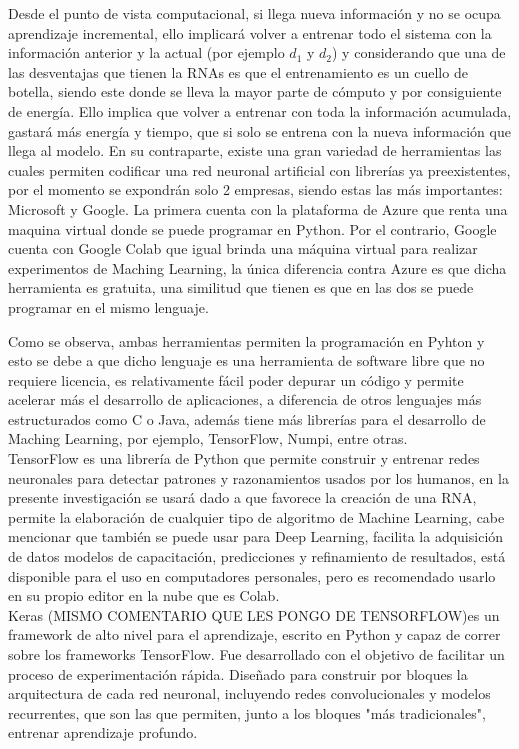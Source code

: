     Desde el punto de vista computacional, si llega nueva información y no se ocupa aprendizaje 
    incremental, ello implicar\'a volver a entrenar todo el sistema con la información anterior y 
    la actual (por ejemplo $d_{1}$ y $d_{2}$) y considerando que una de las desventajas que tienen la 
    RNAs es que el entrenamiento es un cuello de botella, siendo este donde se lleva la mayor 
    parte de cómputo y por consiguiente de energía. Ello implica que volver a entrenar con toda 
    la información acumulada, gastará más energía y tiempo, que si solo se entrena con la nueva 
    información que llega al modelo. En su contraparte,  existe una gran variedad de herramientas 
    las cuales permiten codificar una red neuronal artificial con librerías ya preexistentes, por 
    el momento se expondrán solo 2 empresas, siendo estas las más importantes: Microsoft y Google. 
    La primera cuenta con la plataforma de Azure que renta una maquina virtual donde se puede 
    programar en Python.  Por el contrario, Google cuenta con Google Colab que igual brinda 
    una m\'aquina virtual para realizar experimentos de Maching Learning, la \'unica diferencia 
    contra Azure es que dicha herramienta es gratuita, una similitud que tienen es que en las 
    dos se puede programar en el mismo lenguaje.

    Como se observa, ambas herramientas permiten la programación en Pyhton y esto se debe a que 
    dicho lenguaje es una herramienta de software libre que no requiere licencia, es relativamente 
    fácil poder depurar un código y permite acelerar más el desarrollo de aplicaciones,  a diferencia 
    de otros lenguajes más estructurados como C o Java, adem\'as tiene m\'as librerías para el 
    desarrollo de Maching Learning, por ejemplo, TensorFlow, Numpi, entre otras. \\

    TensorFlow es una librería de Python que permite construir y entrenar redes neuronales para 
    detectar patrones y razonamientos usados por los humanos, en la presente investigaci\'on se 
    usar\'a dado a que favorece la creaci\'on de una RNA, permite la elaboraci\'on de cualquier 
    tipo de algoritmo de Machine Learning, cabe mencionar que también se puede usar para Deep Learning, 
    facilita la adquisici\'on de datos modelos de capacitaci\'on, predicciones y refinamiento de 
    resultados, est\'a disponible para el uso en computadores personales, pero es recomendado 
    usarlo en su propio editor en la nube que es Colab. \\ 

    Keras (MISMO COMENTARIO QUE LES PONGO DE TENSORFLOW)es un framework de alto nivel para 
    el aprendizaje, escrito en Python y capaz de correr sobre los frameworks TensorFlow. Fue 
    desarrollado con el objetivo de facilitar un proceso de experimentación rápida. Diseñado 
    para construir por bloques la arquitectura de cada red neuronal, incluyendo redes 
    convolucionales y modelos recurrentes, que son las que permiten, junto a los bloques 
    "más tradicionales", entrenar aprendizaje profundo.